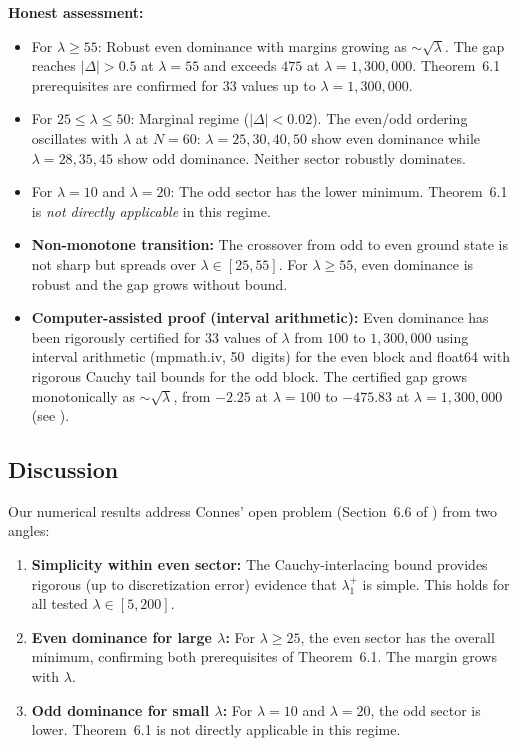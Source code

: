 \documentclass[12pt,a4paper]{article}
\theoremstyle{definition}
\theoremstyle{remark}
\begin{document}
\medskip\noindent
\textbf{Honest assessment:}
\begin{itemize}
  \item For $\lambda \geq 55$: Robust even dominance with margins growing as $\sim\!\sqrt{\lambda}$. The gap reaches $|\Delta| > 0.5$ at $\lambda = 55$ and exceeds $475$ at $\lambda = 1{,}300{,}000$. Theorem~6.1 prerequisites are confirmed for $33$ values up to $\lambda = 1{,}300{,}000$.
  \item For $25 \leq \lambda \leq 50$: Marginal regime ($|\Delta| < 0.02$). The even/odd ordering oscillates with $\lambda$ at $N = 60$: $\lambda = 25, 30, 40, 50$ show even dominance while $\lambda = 28, 35, 45$ show odd dominance. Neither sector robustly dominates.
  \item For $\lambda = 10$ and $\lambda = 20$: The odd sector has the lower minimum. Theorem~6.1 is \emph{not directly applicable} in this regime.
  \item \textbf{Non-monotone transition:} The crossover from odd to even ground state is not sharp but spreads over $\lambda \in [25, 55]$. For $\lambda \geq 55$, even dominance is robust and the gap grows without bound.
  \item \textbf{Computer-assisted proof (interval arithmetic):} Even dominance has been rigorously certified for $33$ values of $\lambda$ from $100$ to $1{,}300{,}000$ using interval arithmetic (mpmath.iv, 50~digits) for the even block and float64 with rigorous Cauchy tail bounds for the odd block. The certified gap grows monotonically as $\sim\!\sqrt{\lambda}$, from $-2.25$ at $\lambda = 100$ to $-475.83$ at $\lambda = 1{,}300{,}000$ (see ).
\end{itemize}

\subsection{Discussion}

Our numerical results address Connes' open problem (Section~6.6 of \cite{Connes2026}) from two angles:
\begin{enumerate}
  \item \textbf{Simplicity within even sector:} The Cauchy-interlacing bound provides rigorous (up to discretization error) evidence that $\lambda_1^+$ is simple. This holds for all tested $\lambda \in [5, 200]$.
  \item \textbf{Even dominance for large $\lambda$:} For $\lambda \geq 25$, the even sector has the overall minimum, confirming both prerequisites of Theorem~6.1. The margin grows with $\lambda$.
  \item \textbf{Odd dominance for small $\lambda$:} For $\lambda = 10$ and $\lambda = 20$, the odd sector is lower. Theorem~6.1 is not directly applicable in this regime.
\end{enumerate}
\end{document}
